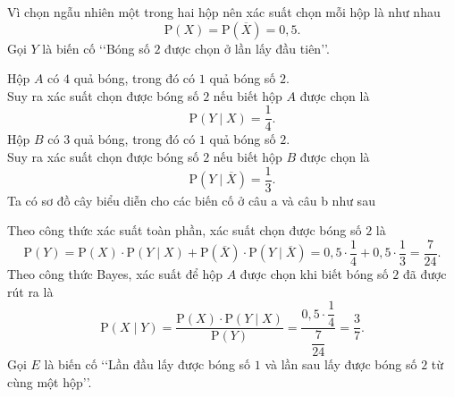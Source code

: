 \begin{ex}
{		Vì chọn ngẫu nhiên một trong hai hộp nên xác suất chọn mỗi hộp là như nhau
		\[\mathrm{P}(X) = \mathrm{P}\left(\overline{X}\right) = 0{,}5.\]
		Gọi $Y$ là biến cố \lq\lq Bóng số $2$ được chọn ở lần lấy đầu tiên\rq\rq.
		\begin{itemchoice}
			\itemch 
			Hộp $A$ có $4$ quả bóng, trong đó có $1$ quả bóng số $2$.\\ Suy ra xác suất chọn được bóng số $2$ nếu biết hộp $A$ được chọn là
			\[\mathrm{P}(Y\mid X) = \dfrac{1}{4}.\]
			\itemch 
			Hộp $B$ có $3$ quả bóng, trong đó có $1$ quả bóng số $2$.\\ Suy ra xác suất chọn được bóng số $2$ nếu biết hộp $B$ được chọn là 
			\[\mathrm{P}\left(Y\mid \overline{X}\right) = \dfrac{1}{3}.\]
			Ta có sơ đồ cây biểu diễn cho các biến cố ở câu a và câu b như sau
			\begin{center}
			\end{center}
			Theo công thức xác suất toàn phần, xác suất chọn được bóng số $2$ là
			\[\mathrm{P}(Y) = \mathrm{P}(X) \cdot \mathrm{P}(Y\mid X) + \mathrm{P}\left(\overline{X}\right) \cdot \mathrm{P}\left(Y\mid \overline{X}\right) = 0{,}5 \cdot \dfrac{1}{4} + 0{,}5 \cdot \dfrac{1}{3} = \dfrac{7}{24}.\]
			\itemch
			Theo công thức Bayes, xác suất để hộp $A$ được chọn khi biết bóng số $2$ đã được rút ra là
			\[\mathrm{P}(X\mid Y) = \dfrac{\mathrm{P}(X) \cdot \mathrm{P}(Y\mid X)}{\mathrm{P}(Y)} = \dfrac{0{,}5 \cdot \dfrac{1}{4}}{\dfrac{7}{24}} = \dfrac{3}{7}.\]
			\itemch 
			Gọi $E$ là biến cố \lq\lq Lần đầu lấy được bóng số $1$ và lần sau lấy được bóng số $2$ từ cùng một hộp\rq\rq.\\

\end{itemchoice}}
\end{ex}
